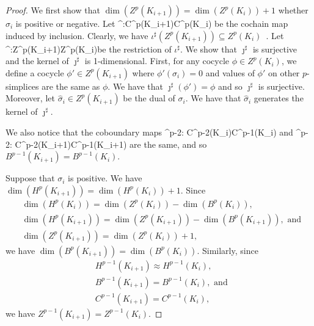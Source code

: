 \documentclass[10pt,a4paper]{amsart}
\theoremstyle{definition}
\newcommand{\Tao}[1]{{\color{magenta}[#1]}}
\newcommand{\red}{\color{red}}
\newcommand{\fsimp}{\sigma}
\newcommand{\Hm}{H}
\newcommand{\Chn}{C}
\newcommand{\Zyc}{Z}
\newcommand{\Bnd}{B}
\newcommand{\sG}{\sigma}
\newcommand{\iG}{\iota}
\newcommand{\dG}{\delta}
\theoremstyle{remark}
\begin{document}
\begin{proof}
We first show that $\dim(\Zyc^p(K_{i+1}))=\dim(\Zyc^p(K_{i}))+1$
whether $\fsimp_i$ is positive or negative.
Let \mbeg\iG^\sharp:\Chn^p(K_{i+1})\to\Chn^p(K_{i})\mend
be the cochain map induced by inclusion.
Clearly, we have  $\iG^\sharp(\Zyc^p(K_{i+1}))\subseteq\Zyc^p(K_{i})$~\cite{hatcher2002algebraic}.
Let \mbeg\jmath^\sharp:\Zyc^p(K_{i+1})\to\Zyc^p(K_{i})\mend be the restriction of $\iG^\sharp$.
We show that $\jmath^\sharp$ is surjective
and the kernel of $\jmath^\sharp$ is 1-dimensional.
First, for any cocycle $\phi\in\Zyc^p(K_{i})$,
we define a cocycle $\phi'\in\Zyc^p(K_{i+1})$
where $\phi'(\fsimp_i)=0$
and values of $\phi'$ on other $p$-simplices are
the same as $\phi$.
We have that $\jmath^\sharp(\phi')=\phi$ and so $\jmath^\sharp$
is surjective.
Moreover, let $\hat{\fsimp}_i\in\Zyc^p(K_{i+1})$ be 
the dual of $\fsimp_i$.
We have that $\hat{\fsimp}_i$ generates 
the kernel of $\jmath^\sharp$.

We also notice that the coboundary maps \mbeg\dG^{p-2}: \Chn^{p-2}(K_i)\to \Chn^{p-1}(K_i)\mend
   and \mbeg\dG^{p-2}: \Chn^{p-2}(K_{i+1})\to \Chn^{p-1}(K_{i+1})\mend
   are the same, and so $\Bnd^{p-1}(K_{i+1})=\Bnd^{p-1}(K_{i})$.

Suppose that $\fsimp_i$ is positive.
We have  $\dim(\Hm^p(K_{i+1}))=\dim(\Hm^p(K_{i}))+1$.
Since 
\begin{align*}
&\dim(\Hm^p(K_{i}))=\dim(\Zyc^p(K_{i}))-\dim(\Bnd^p(K_{i})),\\
&\dim(\Hm^p(K_{i+1}))=\dim(\Zyc^p(K_{i+1}))-\dim(\Bnd^p(K_{i+1})),
\text{ and }\\
&\dim(\Zyc^p(K_{i+1}))=\dim(\Zyc^p(K_{i}))+1,
\end{align*}
we have $\dim(\Bnd^p(K_{i+1}))=\dim(\Bnd^p(K_{i}))$.
Similarly, since
\begin{align*}
&\Hm^{p-1}(K_{i+1})\approx\Hm^{p-1}(K_{i}),\\
&\Bnd^{p-1}(K_{i+1})=\Bnd^{p-1}(K_{i}),
\text{ and }\\
&\Chn^{p-1}(K_{i+1})=\Chn^{p-1}(K_{i}),
\end{align*}
we have $\Zyc^{p-1}(K_{i+1})=\Zyc^{p-1}(K_{i})$.


\end{proof}
\end{document}

